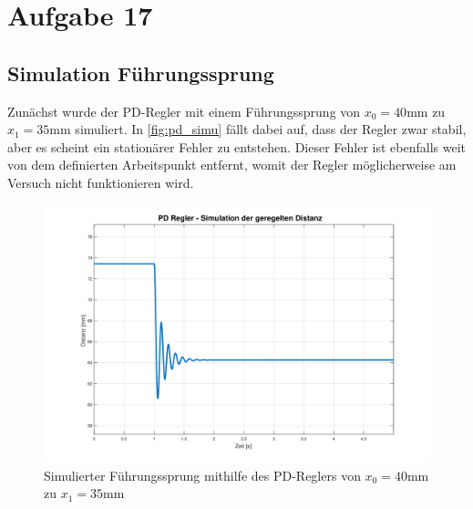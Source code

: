\section{Aufgabe 17}\label{sec:Aufgabe17}
	\subsection*{Simulation Führungssprung}
	Zunächst wurde der PD-Regler mit einem Führungssprung von $x_0 = 40\si{\milli\meter}$ zu $x_1 = 35\si{\milli\meter}$ simuliert. In \autoref{fig:pd_simu} fällt dabei auf, dass der Regler zwar stabil, aber es scheint ein stationärer Fehler zu entstehen. Dieser Fehler ist ebenfalls weit von dem definierten Arbeitspunkt entfernt, womit der Regler möglicherweise am Versuch nicht funktionieren wird.
			\begin{figure}[H]
				\centering
				\includegraphics[width=\textwidth]{./figure/PD_simu.pdf}
				\caption{Simulierter Führungssprung mithilfe des PD-Reglers von $x_0 = 40\si{\milli\meter}$ zu $x_1 = 35\si{\milli\meter}$}
				\label{fig:pd_simu}
			\end{figure}


